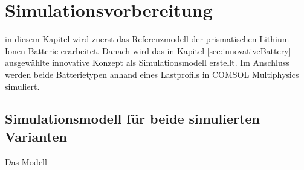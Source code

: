 \newpage
\section{Simulationsvorbereitung}\label{sec:SimulationPREP}

in diesem Kapitel wird zuerst das Referenzmodell der prismatischen Lithium-Ionen-Batterie erarbeitet. Danach wird das in Kapitel \ref{sec:innovativeBattery} ausgewählte innovative Konzept als Simulationsmodell erstellt. Im Anschluss werden beide Batterietypen anhand eines Lastprofils in COMSOL Multiphysics\textsuperscript{\textregistered} simuliert.\\

\subsection{Simulationsmodell für beide simulierten Varianten}\label{sub:ModelforBoth}

Das Modell


	